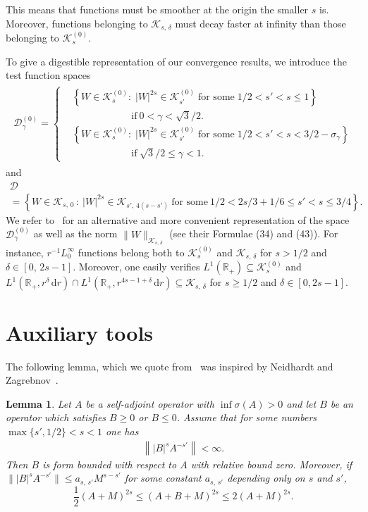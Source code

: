 \documentclass[10pt]{amsart}
\newtheorem{lemm}[cdrthm]{Lemma}
\theoremstyle{definition}
\newcommand*\dr{\mathrm{d}r}
\newcommand*\rz{\mathbb{R}}
\newcommand*\cD{\mathcal{D}}
\newcommand*\cK{\mathcal{K}}
\begin{document}
This means that functions must be smoother at the origin the smaller $s$ is. Moreover, functions belonging to $\cK_{s,\,\delta}$ must decay faster at infinity than those belonging to $\cK_{s}^{(0)}$.

To give a digestible representation of our convergence results, we introduce the test function spaces
\begin{align}\label{eq:deftestnod0}
\begin{split}
\cD_\gamma^{(0)} =
\begin{cases}
& \left\{ W\in\cK_{s}^{(0)}:\; |W|^{2s}\in\cK_{s'}^{(0)} \; \text{for some}\; 1/2<s'<s\leq 1 \right\} \\
& \qquad\qquad\qquad \text{if}\ 0<\gamma<\sqrt3/2.
\\
& \left\{ W\in\cK_{s}^{(0)}:\; |W|^{2s}\in\cK_{s'}^{(0)} \; \text{for some}\; 1/2<s'<s<3/2-\sigma_\gamma \right\} \\
& \qquad\qquad\qquad \text{if}\; \sqrt3/2\leq\gamma<1.
\end{cases}
\end{split}
\end{align}
and
\begin{multline}\label{eq:deftest0}
\cD \\
=\left\{W \in\cK_{s,\,0}\,:\ |W|^{2s}\in\cK_{s',\,4\left(s-s'\right)}\: \text{for some}\: 1/2<2s/3+1/6\leq s'<s\leq 3/4 \right\}.
\end{multline}
We refer to~\cite{Franketal2020P} for an alternative and more convenient representation of the space $\cD_\gamma^{(0)}$ as well as the norm $\|W\|_{\cK_{s,\,\delta}}$ (see their Formulae (34) and (43)). For instance, $r^{-1}L^\infty_0$ functions belong both to $\cK_{s}^{(0)}$ and $\cK_{s,\,\delta}$ for $s>1/2$ and $\delta\in[0,\,2s-1]$. Moreover, one easily verifies $L^1\left(\rz_+\right)\subseteq \cK_{s}^{(0)}$ and $L^1(\rz_+,r^\delta\,\dr)\cap L^1(\rz_+,r^{4s-1+\delta}\,\dr)\subseteq\cK_{s,\,\delta}$ for $s\geq1/2$ and $\delta\in[0,2s-1]$.



\section{Auxiliary tools}

The following lemma, which we quote from~\cite[Lemma~3.4]{Franketal2020P} was inspired by Neidhardt and Zagrebnov~\cite[Lemma~2.2]{NeidhardtZagrebnov1999}.

\begin{lemm}\label{apriori}
Let $A$ be a self-adjoint operator with $\inf\sigma(A)>0$ and let $B$ be an operator which satisfies $B\geq 0$ or $B\leq 0$. Assume that for some numbers $\max\{s',1/2\}<s<1$ one has
\begin{align*}
\left\||B|^s A^{-s'}\right\|<\infty.
\end{align*}
Then $B$ is form bounded with respect to $A$ with relative bound zero. Moreover, if $\||B|^s A^{-s'}\|\leq a_{s,\,s'}M^{s-s'}$ for some constant $a_{s,\,s'}$ depending only on $s$ and $s'$,
\[
\frac12 (A+M)^{2s} \leq (A+B+M)^{2s} \leq 2(A+M)^{2s}.
\]
\end{lemm}
\end{document}

